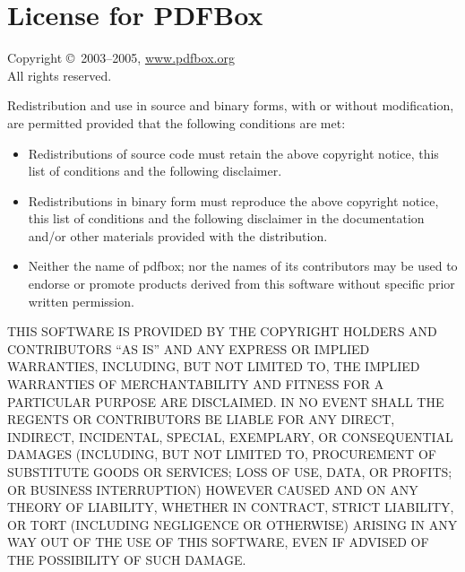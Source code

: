 
\section{License for PDFBox}

\begin{multicols}{3}\tiny\sf%
  
  Copyright \copyright\  2003--2005, \url{www.pdfbox.org}\\
  All rights reserved.
  
  Redistribution and use in source and binary forms, with or without
  modification, are permitted provided that the following conditions
  are met:

  \begin{itemize}
  \item[1.]  Redistributions of source code must retain the above
    copyright notice, this list of conditions and the following
    disclaimer.
  \item[2.]  Redistributions in binary form must reproduce the above
    copyright notice, this list of conditions and the following
    disclaimer in the documentation and/or other materials provided
    with the distribution.
  \item[3.]  Neither the name of pdfbox; nor the names of its
    contributors may be used to endorse or promote products derived
    from this software without specific prior written permission.
  \end{itemize}
  
  THIS SOFTWARE IS PROVIDED BY THE COPYRIGHT HOLDERS AND CONTRIBUTORS
  ``AS IS'' AND ANY EXPRESS OR IMPLIED WARRANTIES, INCLUDING, BUT NOT
  LIMITED TO, THE IMPLIED WARRANTIES OF MERCHANTABILITY AND FITNESS
  FOR A PARTICULAR PURPOSE ARE DISCLAIMED.  IN NO EVENT SHALL THE
  REGENTS OR CONTRIBUTORS BE LIABLE FOR ANY DIRECT, INDIRECT,
  INCIDENTAL, SPECIAL, EXEMPLARY, OR CONSEQUENTIAL DAMAGES (INCLUDING,
  BUT NOT LIMITED TO, PROCUREMENT OF SUBSTITUTE GOODS OR SERVICES;
  LOSS OF USE, DATA, OR PROFITS; OR BUSINESS INTERRUPTION) HOWEVER
  CAUSED AND ON ANY THEORY OF LIABILITY, WHETHER IN CONTRACT, STRICT
  LIABILITY, OR TORT (INCLUDING NEGLIGENCE OR OTHERWISE) ARISING IN
  ANY WAY OUT OF THE USE OF THIS SOFTWARE, EVEN IF ADVISED OF THE
  POSSIBILITY OF SUCH DAMAGE.

\end{multicols}